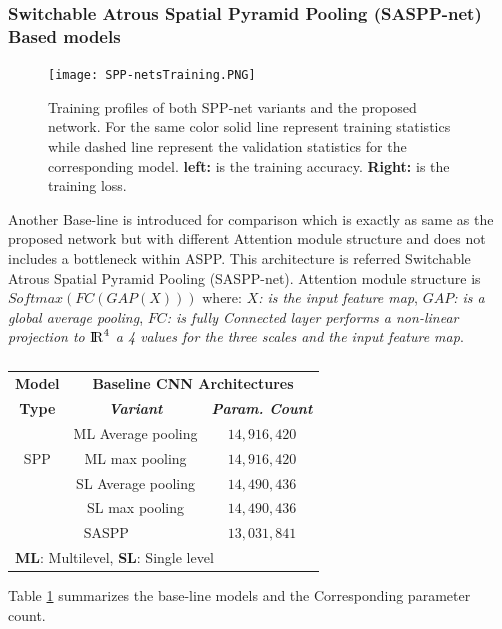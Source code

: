 \subsubsection{Switchable Atrous Spatial Pyramid Pooling (SASPP-net) Based models} 
\begin{center}
    \begin{figure}[htbp]
    \centerline{\texttt{[image: SPP-netsTraining.PNG]}}
    \caption{Training profiles of both SPP-net variants and the proposed network. For the same color solid line represent training statistics while dashed line represent the validation statistics for the corresponding model. \textbf{left:} is the training accuracy. \textbf{Right:} is the training loss.}
    \label{SPP-train}
    \end{figure}
    \end{center}
Another Base-line is introduced for comparison which is exactly as same as the proposed network but with different Attention module structure and does not includes a bottleneck within ASPP. This architecture is referred Switchable Atrous Spatial Pyramid Pooling (SASPP-net). Attention module structure is $Softmax(FC(GAP(X)))$ where: \textit{$X$: is the input feature map}, \textit{$GAP$: is a global average pooling},  \textit{$FC$: is fully Connected layer performs a non-linear projection to ${\rm I\!R}^{4}$ a 4 values for the three scales and the input feature map}.\\

\begin{table}[htbp]
\caption{}
\begin{center}
\begin{tabular}{|c|c|c|}
\hline
\textbf{Model}&\multicolumn{2}{|c|}{\textbf{Baseline CNN Architectures}} \\
\cline{2-3} 
\textbf{Type} & \textbf{\textit{Variant}}& \textbf{\textit{Param. Count}} \\
\hline
  & ML Average pooling & $14,916,420$   \\
\cline{2-3} 
SPP & ML max pooling & $14,916,420$   \\
\cline{2-3} 
  & SL Average pooling & $14,490,436$   \\
\cline{2-3} 
  & SL max pooling & $14,490,436$ \\
\hline
\multicolumn{2}{|c|}{SASPP} & $13,031,841$\\
\hline
\multicolumn{3}{l}{ \textbf{ML}: Multilevel, \textbf{SL}: Single level}
\end{tabular}
\label{Basarch}
\end{center}
\end{table}
Table \ref{Basarch} summarizes the base-line models and the Corresponding parameter count.
